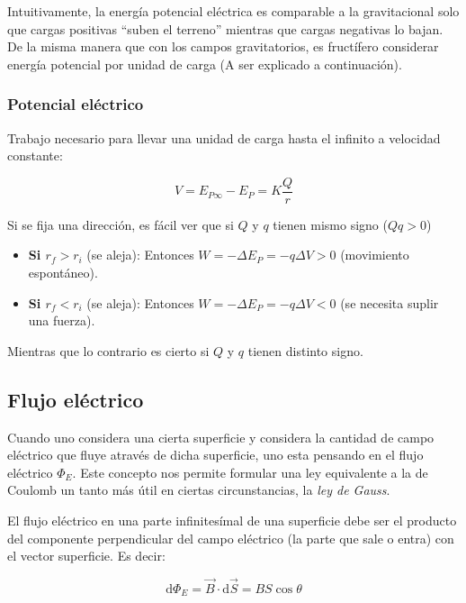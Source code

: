 \documentclass[10pt]{article}
\newcommand{\diff}{\mathrm{d}}
\begin{document}
Intuitivamente, la energía potencial eléctrica es comparable a la gravitacional solo que cargas positivas ``suben el terreno'' mientras que cargas negativas lo bajan. De la misma manera que con los campos
gravitatorios, es fructífero considerar energía potencial por unidad de carga (A ser explicado a continuación).

\subsubsection{Potencial eléctrico}

\begin{definition}
  Trabajo necesario para llevar una unidad de carga hasta el infinito a velocidad constante:

  \[ V = E_{P \infty} - E_P = K \frac{Q}{r} \]
\end{definition}

\begin{remark}
    Si se fija una dirección, es fácil ver que si $ Q $ y $ q $ tienen mismo signo ($ Q q > 0 $)
    \begin{itemize}
      \item \textbf{Si $ r_f > r_i $} (se aleja): Entonces $ W = -\Delta E_P = -q \Delta V > 0 $ (movimiento espontáneo).
      \item \textbf{Si $ r_f < r_i $} (se aleja): Entonces $ W = -\Delta E_P = -q \Delta V < 0 $ (se necesita suplir una fuerza).
    \end{itemize}
  Mientras que lo contrario es cierto si $ Q $ y $ q $ tienen distinto signo.
\end{remark}

\subsection{Flujo eléctrico}

Cuando uno considera una cierta superficie y considera la cantidad de campo eléctrico que fluye através de dicha superficie,
uno esta pensando en el flujo eléctrico $ \Phi_E $. Este concepto nos permite formular una ley equivalente a la de Coulomb
un tanto más útil en ciertas circunstancias, la \textit{ley de Gauss}.

El flujo eléctrico en una parte infinitesímal de una superficie debe ser el producto del componente perpendicular del campo
eléctrico (la parte que sale o entra) con el vector superficie. Es decir:

\[ \diff \Phi_E = \vec{B} \cdot \diff \vec{S} = B S \cos \theta \]
\end{document}
